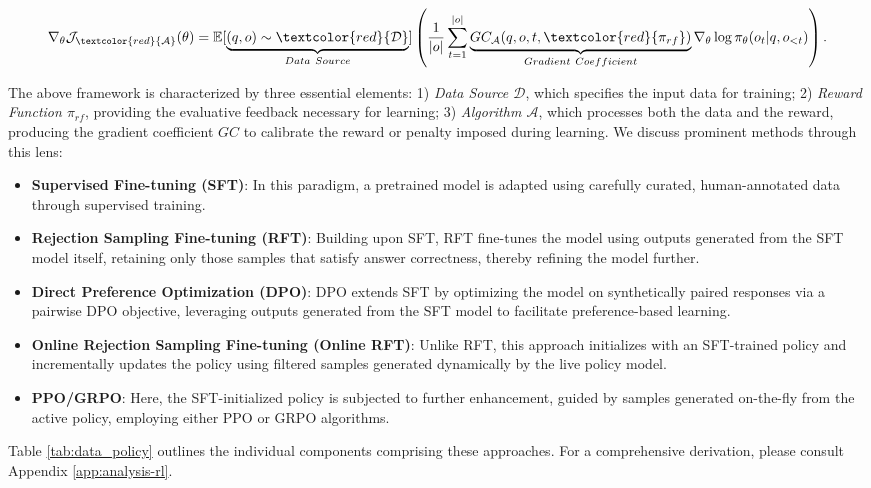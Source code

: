 \begin{equation}
    \nabla_{\theta}\mathcal{J}_{\textcolor{red}{\mathcal{A}}}(\theta) = \mathbb{E}[\underbrace{(q,o) \sim \textcolor{red}{\mathcal{D}}}_{Data \ Source}]\left( \frac{1}{|o|} \sum_{t=1}^{|o|}  \underbrace{GC_{{\mathcal{A}}}(q, o, t, \textcolor{red}{\pi_{{rf}}})}_{Gradient \ Coefficient}  \nabla_{\theta}\log \pi_{\theta}(o_t | q, o_{<t})\right).
\label{eq:objective}
\end{equation}

The above framework is characterized by three essential elements: 1) \textit{Data Source $\mathcal{D}$}, which specifies the input data for training; 2) \textit{Reward Function $\pi_{{rf}}$}, providing the evaluative feedback necessary for learning; 3) \textit{Algorithm $\mathcal{A}$}, which processes both the data and the reward, producing the gradient coefficient $GC$ to calibrate the reward or penalty imposed during learning. We discuss prominent methods through this lens:

\begin{itemize}
    \item  \textbf{Supervised Fine-tuning (SFT)}: In this paradigm, a pretrained model is adapted using carefully curated, human-annotated data through supervised training.
    \item \textbf{Rejection Sampling Fine-tuning (RFT)}: Building upon SFT, RFT fine-tunes the model using outputs generated from the SFT model itself, retaining only those samples that satisfy answer correctness, thereby refining the model further.
    \item \textbf{Direct Preference Optimization (DPO)}: DPO extends SFT by optimizing the model on synthetically paired responses via a pairwise DPO objective, leveraging outputs generated from the SFT model to facilitate preference-based learning.
    \item \textbf{Online Rejection Sampling Fine-tuning (Online RFT)}: Unlike RFT, this approach initializes with an SFT-trained policy and incrementally updates the policy using filtered samples generated dynamically by the live policy model.
    \item \textbf{PPO/GRPO}: Here, the SFT-initialized policy is subjected to further enhancement, guided by samples generated on-the-fly from the active policy, employing either PPO or GRPO algorithms.
\end{itemize}

Table \ref{tab:data_policy} outlines the individual components comprising these approaches. For a comprehensive derivation, please consult Appendix \ref{app:analysis-rl}.


